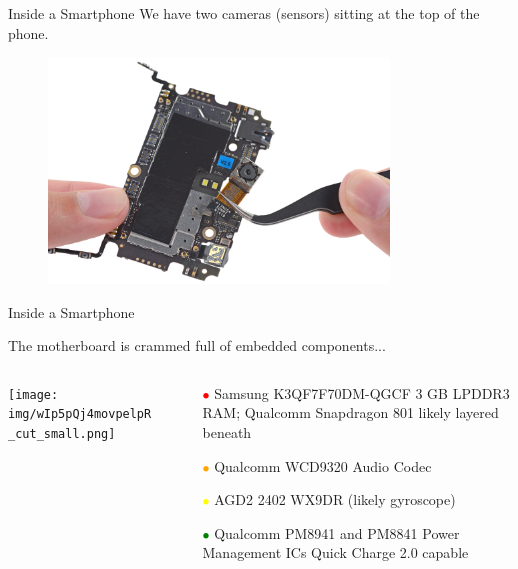\documentclass[aspectratio=169]{beamer}
\begin{document}
	\begin{frame}{Inside a Smartphone}
		We have two cameras (sensors) sitting at the top of the phone.
		\begin{figure}[b]		
		\centering
		\includegraphics[width=\textwidth,height=6cm,keepaspectratio]{img/SuhLygXH4QXdDMEm_small.png}
		\end{figure}
	\end{frame}



	\begin{frame}{Inside a Smartphone}
		\begin{flushleft}The motherboard is crammed full of embedded components...\end{flushleft}
		\begin{columns}
		\begin{column}{0.55\textwidth}	
		\centering
		\texttt{[image: img/wIp5pQj4movpelpR\_cut\_small.png]}	
		\end{column}
		\begin{column}{0.45\textwidth}
		\centering		
		\begin{footnotesize}
		\begin{itemize}
		\setlength\itemsep{1em}
		\item[\textcolor{red}{$\bullet$}] Samsung K3QF7F70DM-QGCF 3 GB LPDDR3 RAM; Qualcomm Snapdragon 801 likely layered beneath
		\item[\textcolor{orange}{$\bullet$}] Qualcomm WCD9320 Audio Codec
		\item[\textcolor{yellow}{$\bullet$}] AGD2 2402 WX9DR (likely gyroscope)
		\item[\textcolor{green}{$\bullet$}] Qualcomm PM8941 and PM8841 Power Management ICs Quick Charge 2.0 capable
		\end{itemize}
		\end{footnotesize}
		\end{column}
		\end{columns}
	\end{frame}  
\end{document}
